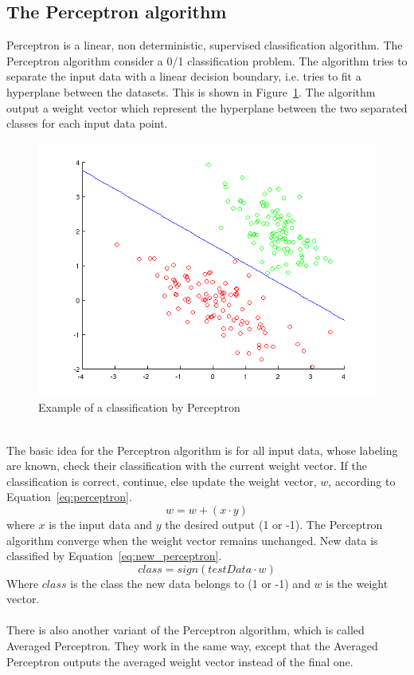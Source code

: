 \subsection{The Perceptron algorithm}
Perceptron is a linear, non deterministic, supervised classification algorithm. The Perceptron algorithm consider a 0/1 classification problem. \citep{perceptron_ai}
The algorithm tries to separate the input data with a linear decision boundary, i.e. tries to fit a hyperplane between the datasets. \citep{perceptron_url} This is shown in Figure~\ref{fig:perceptron}. The algorithm output a weight vector which represent the hyperplane between the two separated classes for each input data point. \citep{perceptron_url}
\begin{figure}[h!]
\centering
\includegraphics[scale = 0.5]{fig/perceptron_example.png}
\caption{Example of a classification by Perceptron}
\label{fig:perceptron}
\end{figure}\\
The basic idea for the Perceptron algorithm is for all input data, whose labeling are known, check their classification with the current weight vector. If the classification is correct, continue, else update the weight vector, $w$, according to Equation~\ref{eq:perceptron}. \citep{perceptron_ai}
\begin{equation}
\label{eq:perceptron}
w = w + (x \cdot y)
\end{equation}
where $x$ is the input data and $y$ the desired output (1 or -1). The Perceptron algorithm converge when the weight vector remains unchanged. \citep{perceptron_ai} New data is classified by Equation~\ref{eq:new_perceptron}.
\begin{equation}
\label{eq:new_perceptron}
class = sign(testData \cdot w)
\end{equation}
Where $class$ is the class the new data belongs to (1 or -1) and $w$ is the weight vector.\\\\
There is also another variant of the Perceptron algorithm, which is called Averaged Perceptron. They work in the same way, except that the Averaged Perceptron outputs the averaged weight vector instead of the final one.
